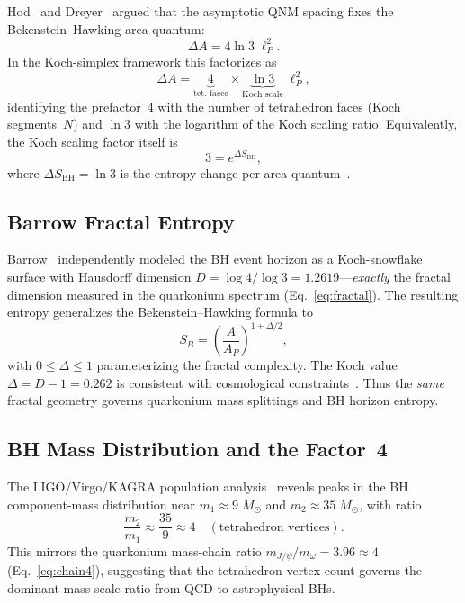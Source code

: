 \documentclass[twocolumn,showpacs,preprintnumbers,amsmath,amssymb,prl]{revtex4-2}
\begin{document}
Hod~\cite{Hod1998} and Dreyer~\cite{Dreyer2003} argued that the
asymptotic QNM spacing fixes the Bekenstein--Hawking area quantum:
\begin{equation}
    \Delta A = 4\ln 3 \;\ell_P^2.
    \label{eq:areaquantum}
\end{equation}
In the Koch-simplex framework this factorizes as
\begin{equation}
    \Delta A = \underbrace{4}_{\text{tet.\ faces}}
              \times
              \underbrace{\ln 3}_{\text{Koch scale}}
              \;\ell_P^2,
    \label{eq:areafactors}
\end{equation}
identifying the prefactor~4 with the number of tetrahedron faces
(Koch segments~$N$) and $\ln 3$ with the logarithm of the Koch
scaling ratio. Equivalently, the Koch scaling factor itself is
\begin{equation}
    3 = e^{\Delta S_{\text{BH}}},
    \label{eq:kochentropy}
\end{equation}
where $\Delta S_{\text{BH}} = \ln 3$ is the entropy change per area
quantum~\cite{Dreyer2003}.

\subsection{Barrow Fractal Entropy}

Barrow~\cite{Barrow2020} independently modeled the BH event horizon as
a Koch-snowflake surface with Hausdorff dimension
$D = \log 4/\log 3 = 1.2619$---\emph{exactly} the fractal dimension
measured in the quarkonium spectrum (Eq.~\ref{eq:fractal}). The
resulting entropy generalizes the Bekenstein--Hawking formula to
\begin{equation}
    S_B = \left(\frac{A}{A_P}\right)^{1 + \Delta/2},
    \label{eq:barrow}
\end{equation}
with $0 \leq \Delta \leq 1$ parameterizing the fractal complexity.
The Koch value $\Delta = D - 1 = 0.262$ is consistent with
cosmological constraints~\cite{Barrow2020}.
Thus the \emph{same} fractal geometry governs quarkonium mass splittings
and BH horizon entropy.

\subsection{BH Mass Distribution and the Factor~4}

The LIGO/Virgo/KAGRA population analysis~\cite{GWTC3pop} reveals
peaks in the BH component-mass distribution near
$m_1 \approx 9\;M_\odot$ and $m_2 \approx 35\;M_\odot$,
with ratio
\begin{equation}
    \frac{m_2}{m_1} \approx \frac{35}{9} \approx 4
    \quad (\text{tetrahedron vertices}).
    \label{eq:bhmassratio}
\end{equation}
This mirrors the quarkonium mass-chain ratio
$m_{J/\psi}/m_\omega = 3.96 \approx 4$
(Eq.~\ref{eq:chain4}), suggesting that the tetrahedron vertex count
governs the dominant mass scale ratio from QCD to astrophysical BHs.
\end{document}
